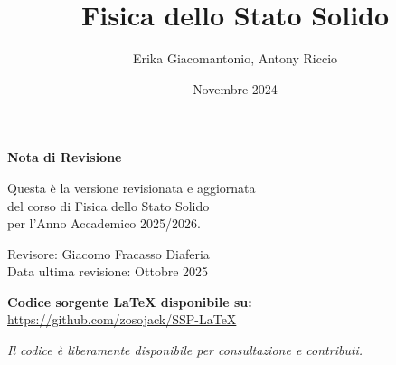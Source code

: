 \documentclass[11pt, a4paper]{report}
\title{Fisica dello Stato Solido}
\author{Erika Giacomantonio, Antony Riccio}
\date{Novembre 2024}
\begin{document}
\fontsize{16pt}{18pt}\selectfont
\maketitle

\thispagestyle{empty}
\vspace*{\fill}
\begin{center}
    \large
    \textbf{Nota di Revisione}
    
    \vspace{1cm}
    
    Questa è la versione revisionata e aggiornata \\
    del corso di Fisica dello Stato Solido \\
    per l'Anno Accademico 2025/2026.
    
    \vspace{0.5cm}
    
    Revisore: Giacomo Fracasso Diaferia \\
    Data ultima revisione: Ottobre 2025
    
    \vspace{1cm}
    
    \textbf{Codice sorgente LaTeX disponibile su:} \\
    \url{https://github.com/zosojack/SSP-LaTeX}
    
    \vspace{0.3cm}
    
    \small
    \textit{Il codice è liberamente disponibile per consultazione e contributi.}
\end{center}
\vspace*{\fill}
\clearpage

\fontsize{14pt}{16pt}\selectfont
\tableofcontents
\thispagestyle{empty}

\thispagestyle{empty}
\clearpage
\setcounter{page}{1}

\fontsize{12pt}{14pt}\selectfont










\end{document}
